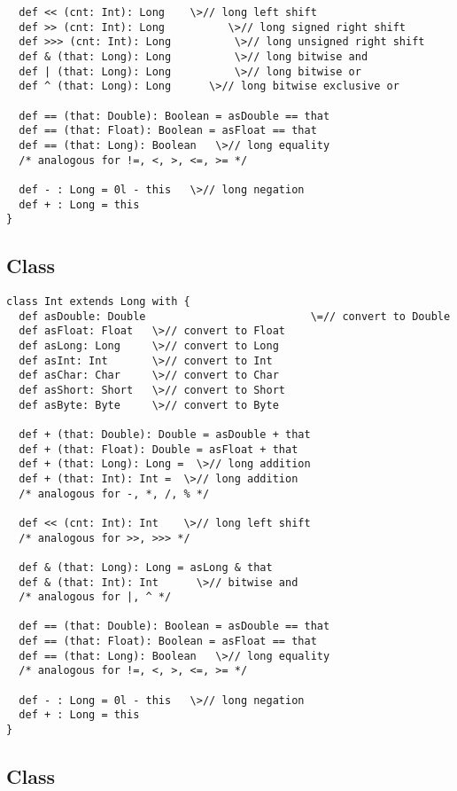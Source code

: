 \documentclass[11pt]{report}
\begin{document}
\begin{itemize}
\begin{verbatim}
  def << (cnt: Int): Long    \>// long left shift
  def >> (cnt: Int): Long          \>// long signed right shift
  def >>> (cnt: Int): Long          \>// long unsigned right shift
  def & (that: Long): Long          \>// long bitwise and
  def | (that: Long): Long          \>// long bitwise or
  def ^ (that: Long): Long	    \>// long bitwise exclusive or

  def == (that: Double): Boolean = asDouble == that
  def == (that: Float): Boolean = asFloat == that
  def == (that: Long): Boolean   \>// long equality
  /* analogous for !=, <, >, <=, >= */

  def - : Long = 0l - this   \>// long negation
  def + : Long = this
}
\end{verbatim}


\subsection{Class }

\begin{verbatim}
class Int extends Long with {
  def asDouble: Double                          \=// convert to Double
  def asFloat: Float   \>// convert to Float
  def asLong: Long     \>// convert to Long
  def asInt: Int       \>// convert to Int
  def asChar: Char     \>// convert to Char
  def asShort: Short   \>// convert to Short
  def asByte: Byte     \>// convert to Byte

  def + (that: Double): Double = asDouble + that
  def + (that: Float): Double = asFloat + that
  def + (that: Long): Long =  \>// long addition
  def + (that: Int): Int =  \>// long addition
  /* analogous for -, *, /, % */

  def << (cnt: Int): Int    \>// long left shift
  /* analogous for >>, >>> */

  def & (that: Long): Long = asLong & that
  def & (that: Int): Int      \>// bitwise and
  /* analogous for |, ^ */

  def == (that: Double): Boolean = asDouble == that
  def == (that: Float): Boolean = asFloat == that
  def == (that: Long): Boolean   \>// long equality
  /* analogous for !=, <, >, <=, >= */

  def - : Long = 0l - this   \>// long negation
  def + : Long = this
}
\end{verbatim}

\subsection{Class }
\label{sec:cls-boolean}


\end{itemize}
\end{document}
